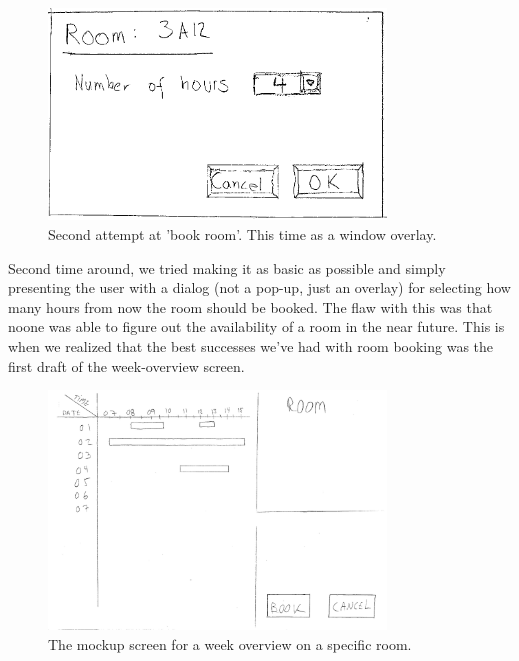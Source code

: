 \begin{figure}[htb]
\begin{center}
\leavevmode
\includegraphics[width=0.8\textwidth]{images/bookRoomMockup2}
\end{center}
\caption{Second attempt at 'book room'. This time as a window overlay.}
\label{fig:book_room_mockup2}
\end{figure}

Second time around, we tried making it as basic as possible and simply presenting the user with a dialog (not a pop-up, just an overlay) for selecting how many hours from now the room should be booked. The flaw with this was that noone was able to figure out the availability of a room in the near future. This is when we realized that the best successes we've had with room booking was the first draft of the week-overview screen.

\begin{figure}[htb]
\begin{center}
\leavevmode
\includegraphics[width=0.8\textwidth]{images/weekMockup}
\end{center}
\caption{The mockup screen for a week overview on a specific room.}
\label{fig:week_mockup}
\end{figure}

